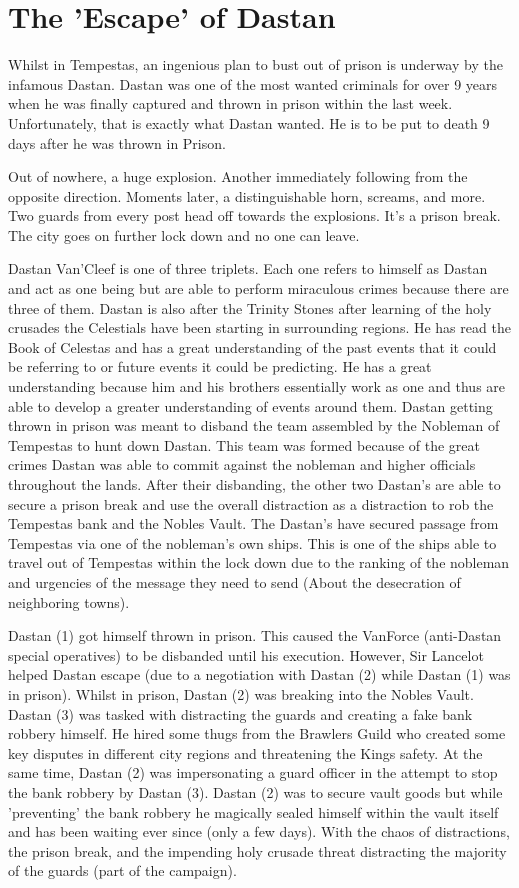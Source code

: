 \section{The 'Escape' of Dastan}

Whilst in Tempestas, an ingenious plan to bust out of prison is underway by the infamous Dastan. Dastan was one of the most wanted criminals for over 9 years when he was finally captured and thrown in prison within the last week. Unfortunately, that is exactly what Dastan wanted. He is to be put to death 9 days after he was thrown in Prison.

Out of nowhere, a huge explosion. Another immediately following from the opposite direction. Moments later, a distinguishable horn, screams, and more. Two guards from every post head off towards the explosions. It’s a prison break. The city goes on further lock down and no one can leave. 

Dastan Van’Cleef is one of three triplets. Each one refers to himself as Dastan and act as one being but are able to perform miraculous crimes because there are three of them. Dastan is also after the Trinity Stones after learning of the holy crusades the Celestials have been starting in surrounding regions. He has read the Book of Celestas and has a great understanding of the past events that it could be referring to or future events it could be predicting. He has a great understanding because him and his brothers essentially work as one and thus are able to develop a greater understanding of events around them. Dastan getting thrown in prison was meant to disband the team assembled by the Nobleman of Tempestas to hunt down Dastan. This team was formed because of the great crimes Dastan was able to commit against the nobleman and higher officials throughout the lands. After their disbanding, the other two Dastan’s are able to secure a prison break and use the overall distraction as a distraction to rob the Tempestas bank and the Nobles Vault. The Dastan’s have secured passage from Tempestas via one of the nobleman’s own ships. This is one of the ships able to travel out of Tempestas within the lock down due to the ranking of the nobleman and urgencies of the message they need to send (About the desecration of neighboring towns).

Dastan (1) got himself thrown in prison. This caused the VanForce (anti-Dastan special operatives) to be disbanded until his execution. However, Sir Lancelot helped Dastan escape (due to a negotiation with Dastan (2) while Dastan (1) was in prison). Whilst in prison, Dastan (2) was breaking into the Nobles Vault. Dastan (3) was tasked with distracting the guards and creating a fake bank robbery himself. He hired some thugs from the Brawlers Guild who created some key disputes in different city regions and threatening the Kings safety. At the same time, Dastan (2) was impersonating a guard officer in the attempt to stop the bank robbery by Dastan (3). Dastan (2) was to secure vault goods but while 'preventing' the bank robbery he magically sealed himself within the vault itself and has been waiting ever since (only a few days). With the chaos of distractions, the prison break, and the impending holy crusade threat distracting the majority of the guards (part of the campaign). 

